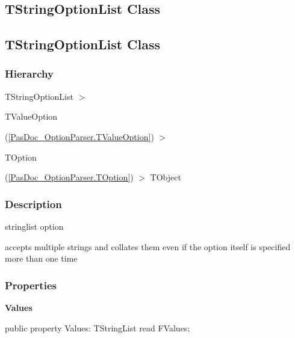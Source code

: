 \documentclass{report}
\newif\ifpdf
\begin{document}
\subsection*{\large{\textbf{TStringOptionList Class}}\normalsize\hspace{1ex}\hrulefill}
\else
\subsection*{TStringOptionList Class}
\fi
\label{PasDoc_OptionParser.TStringOptionList}
\subsubsection*{\large{\textbf{Hierarchy}}\normalsize\hspace{1ex}\hfill}
TStringOptionList {$>$} \begin{ttfamily}TValueOption\end{ttfamily}(\ref{PasDoc_OptionParser.TValueOption}) {$>$} \begin{ttfamily}TOption\end{ttfamily}(\ref{PasDoc_OptionParser.TOption}) {$>$} 
TObject
\subsubsection*{\large{\textbf{Description}}\normalsize\hspace{1ex}\hfill}
stringlist option\hfill\vspace*{1ex}

 accepts multiple strings and collates them even if the option itself is specified more than one time\subsubsection*{\large{\textbf{Properties}}\normalsize\hspace{1ex}\hfill}
\begin{list}{}{
\setlength{\itemindent}{0cm}
\setlength{\listparindent}{0cm}
\setlength{\leftmargin}{\evensidemargin}
\addtolength{\leftmargin}{\tmplength}
\settowidth{\labelsep}{X}
\addtolength{\leftmargin}{\labelsep}
\setlength{\labelwidth}{\tmplength}
}
\label{PasDoc_OptionParser.TStringOptionList-Values}
\item[\textbf{Values}\hfill]
\ifpdf
\begin{flushleft}
\fi
\begin{ttfamily}
public property Values: TStringList read FValues;\end{ttfamily}

\ifpdf
\end{flushleft}
\fi


\par  \end{list}
\end{document}
